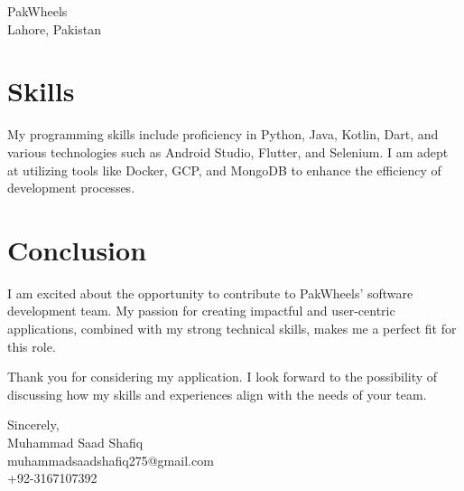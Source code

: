 \documentclass[letterpaper,11pt]{letter}
\makeatletter
\def\yourname{Muhammad Saad Shafiq}
\def\youremail{muhammadsaadshafiq275@gmail.com}
\def\yourphone{+92-3167107392}
\def\companyname{PakWheels}
\makeatother
\begin{document}
\begin{letter}{\companyname\\
                Lahore, Pakistan\\}
\section*{Skills}
My programming skills include proficiency in Python, Java, Kotlin, Dart, and various technologies such as Android Studio, Flutter, and Selenium. I am adept at utilizing tools like Docker, GCP, and MongoDB to enhance the efficiency of development processes.

\section*{Conclusion}
I am excited about the opportunity to contribute to \companyname' software development team. My passion for creating impactful and user-centric applications, combined with my strong technical skills, makes me a perfect fit for this role.

Thank you for considering my application. I look forward to the possibility of discussing how my skills and experiences align with the needs of your team.

\closing{Sincerely,\\
\yourname \\
\youremail\\
\yourphone }

\end{letter}
\end{document}
